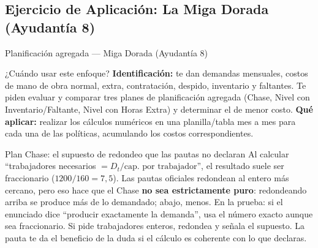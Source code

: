 \subsection[PA: La Miga Dorada]{Ejercicio de Aplicación: La Miga Dorada (Ayudantía 8)}

\begin{ejercicio}{Planificación agregada --- Miga Dorada (Ayudantía 8)}
\begin{tipprueba}{¿Cuándo usar este enfoque?}
\textbf{Identificación:} te dan demandas mensuales, costos de mano de obra normal, extra, contratación, despido, inventario y faltantes. Te piden evaluar y comparar tres planes de planificación agregada (Chase, Nivel con Inventario/Faltante, Nivel con Horas Extra) y determinar el de menor costo.
\textbf{Qué aplicar:} realizar los cálculos numéricos en una planilla/tabla mes a mes para cada una de las políticas, acumulando los costos correspondientes.
\end{tipprueba}

\begin{trampa}{Plan Chase: el supuesto de redondeo que las pautas no declaran}
Al calcular ``trabajadores necesarios $= D_t / \text{cap.\ por trabajador}$'', el resultado suele ser fraccionario ($1200/160 = 7{,}5$). Las pautas oficiales redondean al entero más cercano, pero eso hace que el Chase \textbf{no sea estrictamente puro}: redondeando arriba se produce más de lo demandado; abajo, menos. En la prueba: si el enunciado dice ``producir exactamente la demanda'', usa el número exacto aunque sea fraccionario. Si pide trabajadores enteros, redondea y señala el supuesto. La pauta te da el beneficio de la duda si el cálculo es coherente con lo que declaras.
\end{trampa}


\end{ejercicio}
